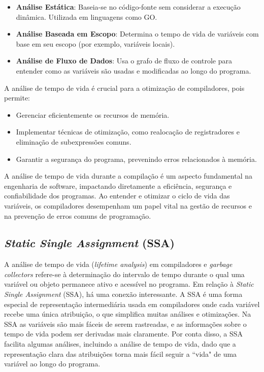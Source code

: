 \documentclass{article}
\begin{document}
    \begin{itemize}
        \item \textbf{Análise Estática}: Baseia-se no código-fonte sem considerar a execução dinâmica.
        Utilizada em linguagens como GO.

        \item \textbf{Análise Baseada em Escopo}: Determina o tempo de vida de variáveis com base em
        seu escopo (por exemplo, variáveis locais).

        \item \textbf{Análise de Fluxo de Dados}: Usa o grafo de fluxo de controle para entender
        como as variáveis são usadas e modificadas ao longo do programa.
    \end{itemize}

    A análise de tempo de vida é crucial para a otimização de compiladores, pois permite:

    \begin{itemize}
        \item Gerenciar eficientemente os recursos de memória.

        \item Implementar técnicas de otimização, como realocação de registradores e eliminação de subexpressões comuns.

        \item Garantir a segurança do programa, prevenindo erros relacionados à memória.
    \end{itemize}

    A análise de tempo de vida durante a compilação é um aspecto fundamental na engenharia de software,
    impactando diretamente a eficiência, segurança e confiabilidade dos programas. Ao entender e
    otimizar o ciclo de vida das variáveis, os compiladores desempenham um papel vital na gestão
    de recursos e na prevenção de erros comuns de programação.

    \subsection*{\emph{Static Single Assignment} (SSA)}

    A análise de tempo de vida (\emph{lifetime analysis}) em compiladores e \emph{garbage collectors} refere-se à
    determinação do intervalo de tempo durante o qual uma variável ou objeto permanece ativo e acessível no programa.
    Em relação à \emph{Static Single Assignment} (SSA), há uma conexão interessante. A SSA é uma forma especial de representação
    intermediária usada em compiladores onde cada variável recebe uma única atribuição, o que simplifica muitas análises e otimizações.
    Na SSA as variáveis são mais fáceis de serem rastreadas, e as informações sobre o tempo de vida podem ser derivadas mais claramente.
    Por conta disso, a SSA facilita algumas análises, incluindo a análise de tempo de vida, dado que a representação clara das
    atribuições torna mais fácil seguir a ``vida" de uma variável ao longo do programa.
\end{document}
